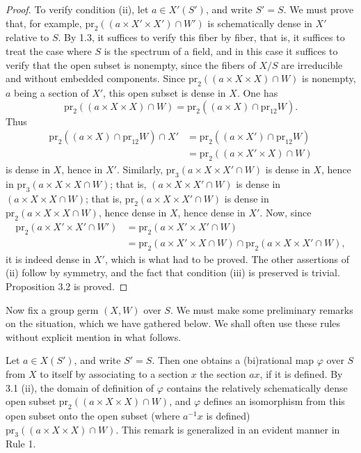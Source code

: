 \begin{proof}
To verify condition (ii), let
\(a\in X'(S')\), and write \(S'=S\).
We must prove that, for example,
\(\mathrm{pr}_2((a\times X'\times X')\cap W')\)
is schematically dense in
\(X'\) relative to \(S\).
By 1.3, it suffices to verify
this fiber by fiber, that is,
it suffices to treat the case
where \(S\) is the spectrum
of a field, and in this case
it suffices to verify that
the open subset is nonempty,
since the fibers of \(X/S\)
are irreducible and \og without
embedded components\fg.
Since \(\mathrm{pr}_2((a\times X\times X)\cap W)\)
is nonempty, \(a\) being a
section of \(X'\), this open
subset is dense in \(X\).
One has
\[
\mathrm{pr}_2((a\times X\times X)\cap W)
=\mathrm{pr}_2((a\times X)\cap\mathrm{pr}_{12}W).
\]
Thus
\[
\begin{aligned}
\mathrm{pr}_2((a\times X)\cap\mathrm{pr}_{12}W)\cap X'
 &=\mathrm{pr}_2((a\times X')\cap\mathrm{pr}_{12}W)\\
 &=\mathrm{pr}_2((a\times X'\times X)\cap W)
\end{aligned}
\]
is dense in \(X\), hence in \(X'\).
Similarly, \(\mathrm{pr}_3(a\times X\times X'\cap W)\)
is dense in \(X\), hence in
\(\mathrm{pr}_3(a\times X\times X\cap W)\);
that is, \((a\times X\times X'\cap W)\)
is dense in \((a\times X\times X\cap W)\);
that is, \(\mathrm{pr}_2(a\times X\times X'\cap W)\)
is dense in \(\mathrm{pr}_2(a\times X\times X\cap W)\),
hence dense in \(X\), hence dense in \(X'\).
Now, since
\[
\begin{aligned}
\mathrm{pr}_2(a\times X'\times X'\cap W')
 &=\mathrm{pr}_2(a\times X'\times X'\cap W)\\
 &=\mathrm{pr}_2(a\times X'\times X\cap W)
\cap\mathrm{pr}_2(a\times X\times X'\cap W),
\end{aligned}
\]
it is indeed dense in \(X'\),
which is what had to be proved.
The other assertions of (ii)
follow by symmetry, and the
fact that condition (iii) is
preserved is trivial.
Proposition 3.2 is proved.
\end{proof}

\label{XVIII.3.2.1}
Now fix a group germ \((X,W)\)
over \(S\).
We must make some preliminary
remarks on the situation, which
we have gathered below.
We shall often use these rules
without explicit mention in what follows.

Let \(a\in X(S')\), and write \(S'=S\).
Then one obtains a (bi)rational
map \(\varphi\) over \(S\) from
\(X\) to itself by associating
to a section \(x\) the section
\(ax\), if it is defined.
By 3.1 (ii), the domain of
definition of \(\varphi\)
contains the relatively
schematically dense open subset
\(\mathrm{pr}_2((a\times X\times X)\cap W)\),
and \(\varphi\) defines an
isomorphism from this open
subset onto the open subset
(where \(a^{-1}x\) is defined)
\(\mathrm{pr}_3((a\times X\times X)\cap W)\).
This remark is generalized
in an evident manner in Rule 1.

